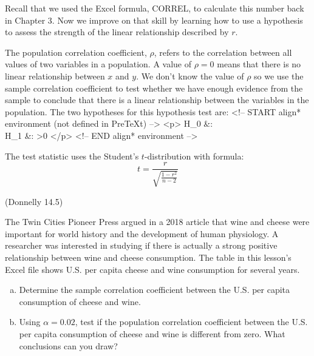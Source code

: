 \documentclass[12pt, letterpaper]{article}
\newcounter{exercise}
\theoremstyle{definition}
\begin{document}
\noindent Recall that we used the Excel formula, CORREL, to calculate this number back in Chapter 3.  Now we improve on that skill by learning how to use a hypothesis to assess the strength of the linear relationship described by $r$.

\vspace*{.1in}

\noindent The population correlation coefficient, $\rho$, refers to the correlation between all values of two variables in a population.  A value of $\rho =0$ means that there is no linear relationship between $x$ and $y$.  We don't know the value of $\rho$ so we use the sample correlation coefficient to test whether we have enough evidence from the sample to conclude that there is a linear relationship between the variables in the population.  The two hypotheses for this hypothesis test are:
<!-- START align* environment (not defined in PreTeXt) -->
	<p>
	H_0 &: \rho{}\\ H_1 &: \rho>0
</p>
<!-- END align* environment -->


\noindent The test statistic uses the Student's $t$-distribution with formula:
$$ t = \frac{r}{\sqrt{\frac{1-r^2}{n-2}}} $$


\newpage


\begin{exercise}  (Donnelly 14.5)

The Twin Cities Pioneer Press argued in a 2018 article that wine and cheese were important for world history and the development of human physiology.  A researcher was interested in studying if there is actually a strong positive relationship between wine and cheese consumption.  The table in this lesson's Excel file shows U.S. per capita cheese and wine consumption for several years.

\end{exercise}


\begin{enumerate}[(a)]

\item Determine the sample correlation coefficient between the U.S. per capita consumption of cheese and wine.

\vfill

\item Using $\alpha = 0.02$, test if the population correlation coefficient between the U.S. per capita consumption of cheese and wine is different from zero.  What conclusions can you draw?

\vfill

\end{enumerate}
\end{document}
